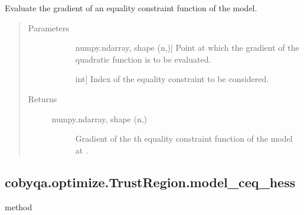 \documentclass[letterpaper,10pt,english]{sphinxmanual}
\begin{document}
\begin{fulllineitems}
\begin{fulllineitems}
\label{\detokenize{refs/generated/cobyqa.optimize.TrustRegion.model_ceq_grad:cobyqa.optimize.TrustRegion.model_ceq_grad}}
\sphinxAtStartPar
Evaluate the gradient of an equality constraint function of the model.
\begin{quote}\begin{description}
\item[{Parameters}] \leavevmode\begin{description}
\item[{}] \leavevmode{[}numpy.ndarray, shape (n,){]}
\sphinxAtStartPar
Point at which the gradient of the quadratic function is to be
evaluated.

\item[{}] \leavevmode{[}int{]}
\sphinxAtStartPar
Index of the equality constraint to be considered.

\end{description}

\item[{Returns}] \leavevmode\begin{description}
\item[{numpy.ndarray, shape (n,)}] \leavevmode
\sphinxAtStartPar
Gradient of the \sphinxhyphen{}th equality constraint function of the model at
.

\end{description}

\end{description}\end{quote}

\end{fulllineitems}



\subsection{cobyqa.optimize.TrustRegion.model\_ceq\_hess}
\label{\detokenize{refs/generated/cobyqa.optimize.TrustRegion.model_ceq_hess:cobyqa-optimize-trustregion-model-ceq-hess}}\label{\detokenize{refs/generated/cobyqa.optimize.TrustRegion.model_ceq_hess::doc}}
\sphinxAtStartPar
method


\end{fulllineitems}
\end{document}
